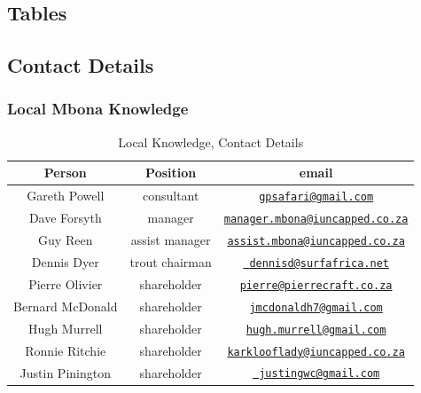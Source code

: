 \begin{appendices}

\chapter{Tables}

\section{Contact Details}

\subsection{Local Mbona Knowledge}

\begin{table}[H]
  \centering
  \begin{tabular}{|c|c|c|}
    \hline
       Person & Position & email  \\ \hline
       Gareth Powell & consultant & \href{mailto:gpsafari@gmail.com}{\nolinkurl{gpsafari@gmail.com}} \\ \hline
       Dave Forsyth & manager & \href{mailto:manager.mbona@iuncapped.co.za}{\nolinkurl{manager.mbona@iuncapped.co.za}} \\ \hline
       Guy Reen & assist manager & \href{mailto:assist.mbona@iuncapped.co.za}{\nolinkurl{assist.mbona@iuncapped.co.za}} \\ \hline
       Dennis Dyer & trout chairman & \href{mailto: dennisd@surfafrica.net}{\nolinkurl{ dennisd@surfafrica.net}} \\ \hline 
       Pierre Olivier & shareholder & \href{mailto:pierre@pierrecraft.co.za}{\nolinkurl{pierre@pierrecraft.co.za}} \\ \hline
       Bernard McDonald & shareholder & \href{mailto:jmcdonaldh7@gmail.com}{\nolinkurl{jmcdonaldh7@gmail.com}} \\ \hline
       Hugh Murrell & shareholder & \href{mailto:hugh.murrell@gmail.com}{\nolinkurl{hugh.murrell@gmail.com}} \\ \hline
       Ronnie Ritchie & shareholder & \href{mailto:karklooflady@iuncapped.co.za}{\nolinkurl{karklooflady@iuncapped.co.za}} \\ \hline
       Justin Pinington & shareholder & \href{mailto: justingwc@gmail.com}{\nolinkurl{ justingwc@gmail.com}} \\ \hline      
    \end{tabular} 
     \caption{Local Knowledge, Contact Details}
  \label{tab:LocalKnowledgeContactDetails}
\end{table}


\end{appendices}
